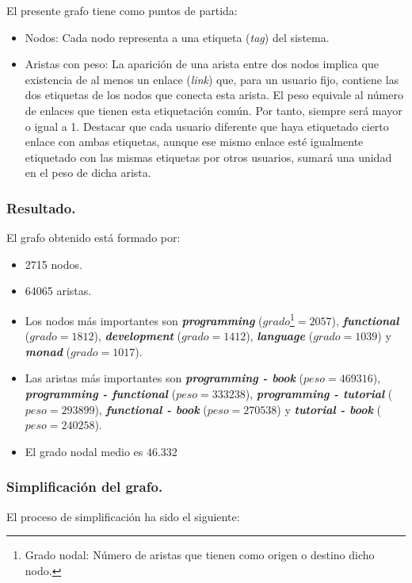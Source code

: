 El presente grafo tiene como puntos de partida:

\begin{itemize}
	\item Nodos: Cada nodo representa a una etiqueta (\emph{tag}) del sistema.
	\item Aristas con peso: La aparición de una arista entre dos nodos implica que existencia de al menos un enlace (\emph{link}) que, para un usuario fijo, contiene las dos etiquetas de los nodos que conecta esta arista. El peso equivale al número de enlaces que tienen esta etiquetación común. Por tanto, siempre será mayor o igual a 1. Destacar que cada usuario diferente que haya etiquetado cierto enlace con ambas etiquetas, aunque ese mismo enlace esté igualmente etiquetado con las mismas etiquetas por otros usuarios, sumará una unidad en el peso de dicha arista.
\end{itemize}

\subsubsection{Resultado.}

El grafo obtenido está formado por:

\begin{itemize}
	\item 2715 nodos.
	\item 64065 aristas.
	\item Los nodos más importantes son \emph{{\bf programming}} ($grado$\footnote{Grado nodal: Número de aristas que tienen como origen o destino dicho nodo.}$ = 2057$), \emph{{\bf functional}} ($grado=1812$), \emph{{\bf development}} ($grado=1412$), \emph{{\bf language}} ($grado=1039$) y \emph{{\bf monad}} ($grado=1017$).
	\item Las aristas más importantes son \emph{{\bf programming - book}} ($peso = 469316$), \emph{{\bf programming - functional}} ($peso = 333238$), \emph{{\bf programming - tutorial}} ($peso = 293899$), \emph{{\bf functional - book}} ($peso = 270538$) y \emph{{\bf tutorial - book}} ($peso = 240258$).
	\item El grado nodal medio es $46.332$
\end{itemize}

\subsubsection{Simplificación del grafo.}

El proceso de simplificación ha sido el siguiente:

